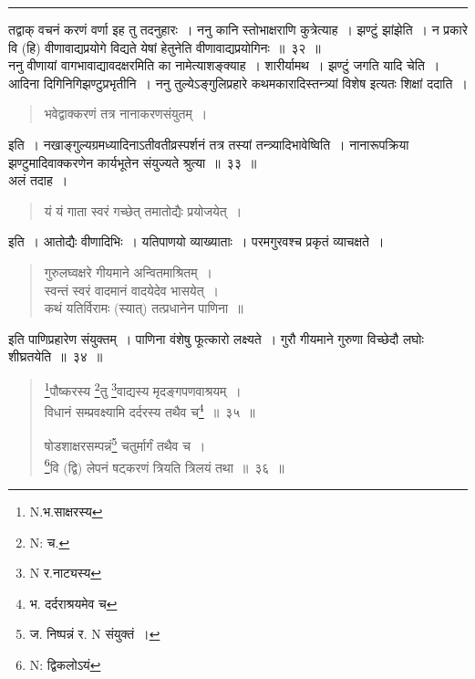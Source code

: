 \documentclass[11pt, openany]{book}
\begin{document}
\hrule

\vspace{2mm}
\noindent
तद्वाक् वचनं करणं वर्णा इह तु तदनुहारः~। ननु कानि स्तोभाक्षराणि कुत्रेत्याह~। {\qtt झण्टुं झांझेति}~। न प्रकारे वि (हि) वीणावाद्यप्रयोगे विद्यते येषां हेतुनेति {\qtt वीणावाद्यप्रयोगिनः}~॥~३२~॥\\

ननु वीणायां वागभावाद्यावदक्षरमिति का नामेत्याशङ्क्याह~। {\qtt शारीर्यामथ}~। {\qtt झण्टुं जगति यादि} चेति~। आदिना दिगिनिगिझण्टुप्रभृतीनि~। ननु तुल्येऽङ्गुलिप्रहारे कथमकारादिस्तन्त्र्यां विशेष इत्यतः शिक्षां ददाति~।

\begin{quote}
{\qt भवेद्वाक्करणं तत्र नानाकरणसंयुतम्~।}
\end{quote}

\noindent
इति~। नखाङ्गुल्यग्रमध्यादिनाऽतीवतीव्रस्पर्शनं तत्र तस्यां तन्त्र्यादिभावेष्विति~। नानारूपक्रिया झण्टुमादिवाक्करणेन कार्यभूतेन संयुज्यते श्रुत्या~॥~३३~॥\\

अलं तदाह~।

\begin{quote}
{\qt  यं यं गाता स्वरं गच्छेत् तमातोद्यैः प्रयोजयेत्~।}
\end{quote}

\noindent
इति~। {\qtt आतोद्यैः} वीणादिभिः~। {\qtt यतिपाणयो} व्याख्याताः~। {\qtt परमगुरवश्च} प्रकृतं व्याचक्षते~।

\begin{quote}
{\na  गुरुलघ्वक्षरे गीयमाने अन्वितमाश्रितम्~।\\
 स्वन्तं स्वरं वादमानं वादयेदेव भासयेत्~।\\
 कथं यतिर्विरामः (स्यात्) तत्प्रधानेन पाणिना~॥}
\end{quote}

\noindent
इति पाणिप्रहारेण {\qtt संयुक्तम्~। पाणिना} वंशेषु फूत्कारो लक्ष्यते~। गुरौ गीयमाने गुरुणा विच्छेदौ लघोः शीघ्रतयेति~॥~३४~॥

\newpage
\begin{quote}
{\na \renewcommand{\thefootnote}{1}\footnote{N.भ.साक्षरस्य}पौष्करस्य \renewcommand{\thefootnote}{1a}\footnote{N: च.}तु \renewcommand{\thefootnote}{2}\footnote{N र.नाट्यस्य}वाद्यस्य मृदङ्गपणवाश्रयम्~।\\
 विधानं सम्प्रवक्ष्यामि दर्दरस्य तथैव च\renewcommand{\thefootnote}{3}\footnote{भ. दर्दराश्रयमेव च}~॥~३५~॥

 षोडशाक्षरसम्पन्नं\renewcommand{\thefootnote}{4}\footnote{ज. निष्पन्नं र. N संयुक्तं~।} चतुर्मार्गं तथैव च~।\\
 \renewcommand{\thefootnote}{5}\footnote{N: द्विकलोऽयं}वि (द्वि) लेपनं षट्करणं त्रियति त्रिलयं तथा~॥~३६~॥}
\end{quote}
\end{document}
